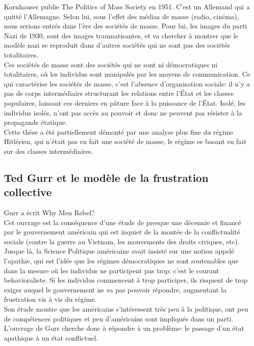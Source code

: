 \documentclass[10pt, a4paper, openany]{book}
\begin{document}
Kornhauser publie The Politics of Mass Society en 1951. C'est un Allemand qui a quitté l'Allemagne. Selon lui, sous l'effet des médias de masse (radio, cinéma), nous serions entrés dans l'ère des sociétés de masse. Pour lui, les images du parti Nazi de 1930, sont des images traumatisantes, et va chercher à montrer que le modèle nazi se reproduit dans d'autres sociétés qui ne sont pas des sociétés totalitaires. \\
Ces sociétés de masse sont des sociétés qui ne sont ni démocratiques ni totalitaires, où les individus sont manipulés par les moyens de communication. Ce qui caractérise les sociétés de masse, c'est l'absence d'organisation sociale: il n'y a pas de corps intermédiaire structurant les relations entre l'État et les classes populaires, laissant ces derniers en pâture face à la puissance de l'État. Isolé, les individus isolés, n'ont pas accès au pouvoir et donc ne peuvent pas résister à la propagande étatique. \\
Cette thèse a été partiellement démonté par une analyse plus fine du régime Hitlérien, qui n'était pas en fait une société de masse, le régime se basant en fait sur des classes intermédiaires. 

\subsection{Ted Gurr et le modèle de la frustration collective}

Gurr a écrit Why Men Rebel? \\
Cet ouvrage est la conséquence d'une étude de presque une décennie et financé par le gouvernement américain qui est inquiet de la montée de la conflictualité sociale (contre la guerre au Vietnam, les mouvements des droits civiques, etc). Jusque là, la Science Politique américaine avait insisté sur une notion appelé l'apathie, qui est l'idée que les régimes démocratiques ne sont soutenables que dans la mesure où les individus ne participent pas trop: c'est le courant behavioraliste. Si les individus commencent à trop participer, ils risquent de trop exiger auquel le gouvernement ne va pas pouvoir répondre, augmentant la frustration vis à vis du régime. \\
Son étude montre que les américains s'intéressent très peu à la politique, ont peu de compétences politiques et peu d'américains sont impliqués dans un parti. \\
L'ouvrage de Gurr cherche donc à répondre à un problème: le passage d'un état apathique à un état conflictuel. 
\end{document}
